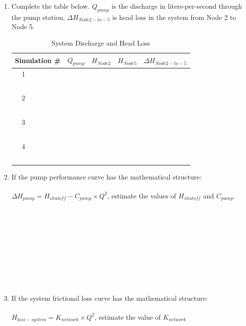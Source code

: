 \documentclass[11pt]{article}
\begin{document}
\begin{enumerate}
\begin{enumerate}
\item Complete the table below.  $Q_{pump}$ is the discharge in liters-per-second through the pump station, $\Delta H_{Node 2 -to- 5}$ is head loss in the system from Node 2 to Node 5.
\begin{table}[htbp]
   \centering
      \caption{System Discharge and Head Loss}
   \begin{tabular}{p{1in} p{1in} p{1in} p{1in} p{1in} } %
Simulation \# & $Q_{pump}$ & $H_{Node2}$ & $H_{Node5}$ & $\Delta H_{Node 2 -to- 5}$ \\
\hline
\hline
~~1 & ~ &~ & ~ & ~ \\
~ & ~ &~ & ~ & ~ \\
\hline
~~2 & ~ &~ & ~ & ~ \\
~ & ~ &~ & ~ & ~ \\
\hline
~~3 & ~ &~ & ~ & ~\\
~ & ~ &~ & ~ & ~ \\
\hline
~~4 & ~ &~ & ~ & ~ \\
~ & ~ &~ & ~ & ~ \\
\hline
   \end{tabular}
   \label{tab:system-curve}
\end{table}



\item If the pump performance curve has the mathematical structure: ~\\~\\
$\Delta H_{pump} = H_{shutoff} - C_{pump} \times Q^2$, estimate the values of $H_{shutoff}$  and $C_{pump}$.
\\
\\
\\
\\
\\
\\
\\
\\
\\
\\

\item If the system frictional loss curve has the mathematical structure:~\\~\\
 $H_{loss-system}= K_{network} \times Q^2$, estimate the value of $K_{network}$


\end{enumerate}
\end{enumerate}
\end{document}
